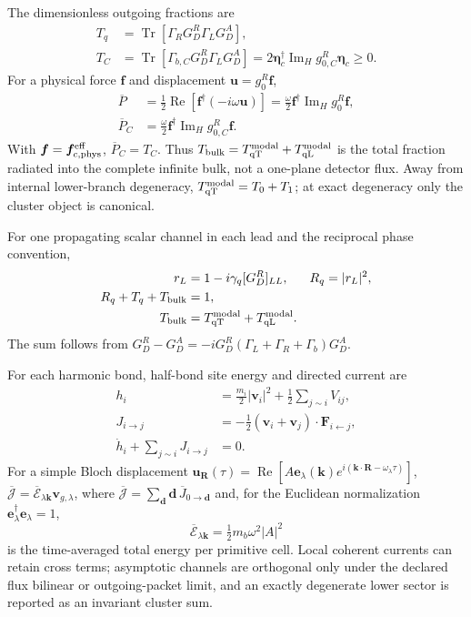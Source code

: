 \documentclass[10pt,aps,pre,reprint,floatfix,notitlepage,nofootinbib]{revtex4-2}
\newcommand{\vk}{\bm{k}}
\newcommand{\ve}{\bm{e}}
\newcommand{\vf}{\bm{f}}
\newcommand{\vu}{\bm{u}}
\newcommand{\veta}{\bm{\eta}}
\newcommand{\qT}{\mathrm{qT}}
\newcommand{\qL}{\mathrm{qL}}
\newcommand{\Tr}{\operatorname{Tr}}
\newcommand{\ImH}{\operatorname{Im}_{\!H}}
\begin{document}
The dimensionless outgoing fractions are
\begin{align}
 T_q&=\Tr[\Gamma_RG_D^R\Gamma_LG_D^A],
 \label{eq:s5-line-transmission}\\
 T_C&=\Tr[\Gamma_{b,C}G_D^R\Gamma_LG_D^A]
 =2\veta_c^\dagger\ImH g_{0,C}^R\veta_c\ge0.
 \label{eq:s5-cluster-transmission}
\end{align}
For a physical force $\vf$ and displacement $\vu=g_0^R\vf$,
\begin{align}
 \overline P
 &=\tfrac12\operatorname{Re}[\vf^\dagger(-i\omega\vu)]
 =\tfrac{\omega}{2}\vf^\dagger\ImH g_0^R\vf,\\
 \overline P_C
 &=\tfrac{\omega}{2}\vf^\dagger\ImH g_{0,C}^R\vf.
 \label{eq:s5-work-identity}
\end{align}
With $\vf=\vf_{c,{\rm phys}}^{\rm eff}$, $\overline P_C=T_C$.  Thus
$T_{\rm bulk}=T_{\qT}^{\rm modal}+T_{\qL}^{\rm modal}$ is the total fraction radiated into the complete infinite bulk, not a one-plane detector flux.  Away from internal lower-branch degeneracy, $T_{\qT}^{\rm modal}=T_0+T_1$; at exact degeneracy only the cluster object is canonical.

For one propagating scalar channel in each lead and the reciprocal phase convention,
\begin{align}
 r_L&=1-i\gamma_q[G_D^R]_{LL},
 &R_q&=|r_L|^2,\\
 R_q+T_q+T_{\rm bulk}&=1,
 \label{eq:s5-closure}\\
 T_{\rm bulk}&=T_{\qT}^{\rm modal}+T_{\qL}^{\rm modal}.
\end{align}
The sum follows from
$G_D^R-G_D^A=-iG_D^R(\Gamma_L+\Gamma_R+\Gamma_b)G_D^A$.

For each harmonic bond, half-bond site energy and directed current are~\cite{Hardy1963}
\begin{align}
 h_i&=\tfrac{m_i}{2}|\bm v_i|^2
 +\tfrac12\sum_{j\sim i}V_{ij},\\
 J_{i\to j}&=-\tfrac12(\bm v_i+\bm v_j)
 \cdot\bm F_{i\leftarrow j},\\
 \dot h_i+\sum_{j\sim i}J_{i\to j}&=0.
 \label{eq:bondcurrent}
\end{align}
For a simple Bloch displacement $\bm u_{\bm R}(\tau)=\operatorname{Re}[A\bm e_\lambda(\vk)e^{i(\vk\cdot\bm R-\omega_\lambda\tau)}]$,
$\overline{\bm{\mathcal J}}=\overline{\mathcal E}_{\lambda\vk}\bm v_{g,\lambda}$, where
$\overline{\bm{\mathcal J}}=\sum_{\bm d}\bm d\,\overline J_{0\to\bm d}$ and, for the Euclidean normalization $\ve_\lambda^\dagger\ve_\lambda=1$,
\begin{equation}
  \overline{\mathcal E}_{\lambda\vk}
  =\tfrac12m_b\omega^2|A|^2
\end{equation}
is the time-averaged total energy per primitive cell.  Local coherent currents can retain cross terms; asymptotic channels are orthogonal only under the declared flux bilinear or outgoing-packet limit, and an exactly degenerate lower sector is reported as an invariant cluster sum.
\end{document}
